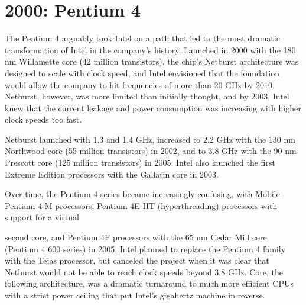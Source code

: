 


\hypertarget{pentium-4}{%
\section{2000: Pentium 4}\label{pentium-4}}

The Pentium 4 arguably took Intel on a path that led to the most
dramatic transformation of Intel in the company's history. Launched in
2000 with the 180 nm Willamette core (42 million transistors), the
chip's Netburst architecture was designed to scale with clock speed, and
Intel envisioned that the foundation would allow the company to hit
frequencies of more than 20 GHz by 2010. Netburst, however, was more
limited than initially thought, and by 2003, Intel knew that the current
leakage and power consumption was increasing with higher clock speeds
too fast.

Netburst launched with 1.3 and 1.4 GHz, increased to 2.2 GHz with the
130 nm Northwood core (55 million transistors) in 2002, and to 3.8 GHz
with the 90 nm Prescott core (125 million transistors) in 2005. Intel
also launched the first Extreme Edition processors with the Gallatin
core in 2003.

Over time, the Pentium 4 series became increasingly confusing, with
Mobile Pentium 4-M processors, Pentium 4E HT (hyperthreading) processors
with support for a virtual

second core, and Pentium 4F processors with the 65 nm Cedar Mill core
(Pentium 4 600 series) in 2005. Intel planned to replace the Pentium 4
family with the Tejas processor, but canceled the project when it was
clear that Netburst would not be able to reach clock speeds beyond 3.8
GHz. Core, the following architecture, was a dramatic turnaround to much
more efficient CPUs with a strict power ceiling that put Intel's
gigahertz machine in reverse.

